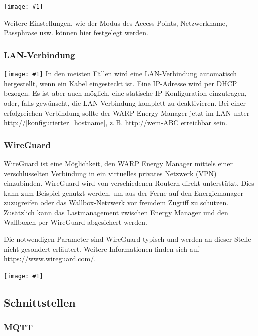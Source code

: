 \documentclass[a4paper,10pt]{article}
\newcommand{\gfx}[1]{\texttt{[image: \#1]}}
\begin{document}
\begin{multicols*}{2}
	\gfx{./img/resized/web_wifi_ap}


	Weitere Einstellungen, wie der Modus des Access-Points,
	Netzwerkname, Passphrase usw. können hier festgelegt werden.

	\subsubsection{LAN-Verbindung}
	\gfx{./img/resized/web_ethernet}
	In den meisten Fällen wird eine
	LAN-Verbindung automatisch hergestellt, wenn ein Kabel eingesteckt ist.
	Eine IP-Adresse wird per DHCP bezogen. Es ist aber auch möglich,
	eine statische IP-Konfiguration	einzutragen, oder, falls gewünscht, die LAN-Verbindung
	komplett zu deaktivieren.
	Bei einer erfolgreichen Verbindung sollte der WARP Energy Manager jetzt im LAN unter
	\url{http://[konfigurierter_hostname]}, z.\,B. \url{http://wem-ABC} erreichbar sein.

	\subsubsection{WireGuard}

	WireGuard ist eine Möglichkeit, den WARP Energy Manager mittels einer verschlüsselten
	Verbindung in ein virtuelles privates Netzwerk (VPN) einzubinden. WireGuard wird von
	verschiedenen Routern direkt unterstützt. Dies kann zum Beispiel genutzt
	werden, um aus der Ferne auf den Energiemanager zuzugreifen oder das
	Wallbox-Netzwerk vor fremdem Zugriff zu schützen. Zusätzlich kann das
	Lastmanagement zwischen Energy Manager und den Wallboxen per WireGuard abgesichert werden.

	Die notwendigen Parameter sind WireGuard-typisch und werden an dieser Stelle
	nicht gesondert erläutert. Weitere Informationen finden sich auf
	\url{https://www.wireguard.com/}.

	\gfx{./img/resized/web_wireguard}

	\subsection{Schnittstellen}
	\subsubsection{MQTT}
	\label{mqtt-interface}


\end{multicols*}
\end{document}
